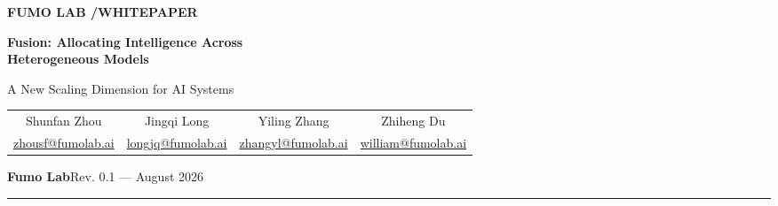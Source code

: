 \documentclass[11pt,a4paper,parskip=half,headings=normal]{scrartcl}
\begin{document}
\thispagestyle{empty}
\begin{flushleft}
{\sffamily\small\bfseries\color{fusionblue}FUMO LAB \enspace/\enspace WHITEPAPER}\par
\vspace{1.4cm}
{\sffamily\fontsize{27}{31}\selectfont\bfseries\color{fusionink}
Fusion: Allocating Intelligence Across\\[0.14em]
Heterogeneous Models}\par
\vspace{0.5cm}
{\sffamily\fontsize{16}{20}\selectfont\color{fusiongray}
A New Scaling Dimension for AI Systems}\par
\vspace{0.55cm}
{\sffamily\small\color{fusionink}
\begin{tabular*}{\textwidth}{@{\extracolsep{\fill}}cccc@{}}
Shunfan Zhou & Jingqi Long & Yiling Zhang & Zhiheng Du \\
{\footnotesize\href{mailto:zhousf@fumolab.ai}{zhousf@fumolab.ai}}
  & {\footnotesize\href{mailto:longjq@fumolab.ai}{longjq@fumolab.ai}}
  & {\footnotesize\href{mailto:zhangyl@fumolab.ai}{zhangyl@fumolab.ai}}
  & {\footnotesize\href{mailto:william@fumolab.ai}{william@fumolab.ai}}
\end{tabular*}}
\par
\vspace{0.4cm}
{\sffamily\small\color{fusiongray}
\textbf{Fumo Lab}\hfill Rev. 0.1 --- August 2026}\par
\vspace{0.45cm}
{\color{fusionblue}\rule{\textwidth}{1.2pt}}
\end{flushleft}
\end{document}
